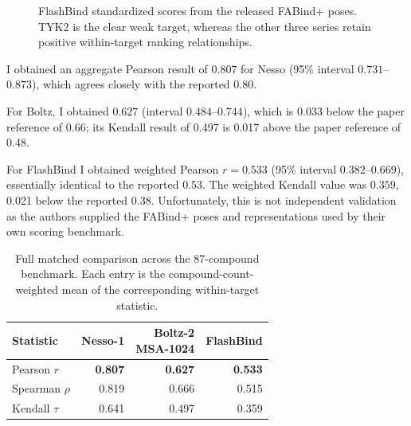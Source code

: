 \documentclass[11pt]{article}
\begin{document}
\begin{figure}[H]
\centering
{}
\caption{FlashBind standardized scores from the released FABind+ poses. TYK2
is the clear weak target, whereas the other three series retain positive
within-target ranking relationships.}
\end{figure}

I obtained an aggregate Pearson result of $0.807$ for Nesso (95\% interval
$0.731$--$0.873$), which agrees closely with the reported $0.80$. 

For Boltz,
I obtained $0.627$ (interval $0.484$--$0.744$), which is 0.033 below the
paper reference of $0.66$; its Kendall result of 0.497 is 0.017 above the
paper reference of 0.48.

For FlashBind I obtained weighted Pearson $r=0.533$ (95\% interval
$0.382$--$0.669$), essentially identical to the reported $0.53$. The weighted
Kendall value was $0.359$, 0.021 below the reported $0.38$. Unfortunately, this is not independent
validation as the authors supplied the FABind+ poses and representations used by
their own scoring benchmark.

\begin{table}[H]
\centering
\small
\begin{tabular}{lrrr}
\toprule
Statistic & Nesso-1 & \shortstack{Boltz-2\\MSA-1024} & FlashBind \\
\midrule
\rowcolor{highlightbg}
Pearson $r$ & \textbf{0.807} & \textbf{0.627} & \textbf{0.533} \\
Spearman $\rho$ & 0.819 & 0.666 & 0.515 \\
Kendall $\tau$ & 0.641 & 0.497 & 0.359 \\
\bottomrule
\end{tabular}
\caption{Full matched comparison across the 87-compound benchmark. Each entry
is the compound-count-weighted mean of the corresponding within-target
statistic.}
\end{table}
\end{document}
